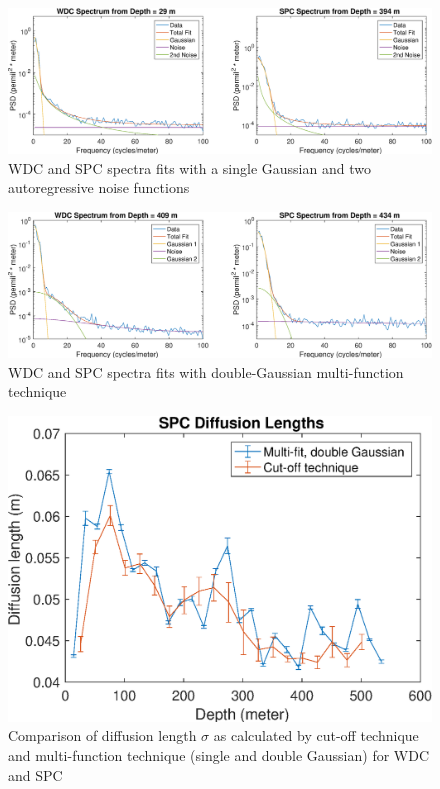 \documentclass[draft, jgrga]{AGUTeX}
\begin{document}
\begin{figure}
\includegraphics[width=.9\linewidth]{GRR_fit.eps}
\caption{WDC and SPC spectra fits with a single Gaussian and two autoregressive noise functions}\label{GRR_fit}
\end{figure}

\begin{figure}
\includegraphics[width=.9\linewidth]{2_gauss.eps}
\caption{WDC and SPC spectra fits with double-Gaussian multi-function technique}\label{2_gauss}
\end{figure}

\begin{figure}
\includegraphics[width=.9\linewidth]{sigma_comp.eps}
\caption{Comparison of diffusion length $\sigma$ as calculated by cut-off technique and multi-function technique (single and double Gaussian) for WDC and SPC}\label{sigma_comp}
\end{figure}
\end{document}
